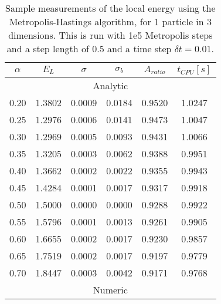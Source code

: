\documentclass[
    a4paper, aps, twocolumn, floatfix, superscriptaddress,
    nofootinbib]{revtex4-1}
\begin{document}
\begin{table}[h!]
\caption{Sample measurements of the local energy using the Metropolis-Hastings algorithm, for 1 particle in 3 dimensions. This is run with 1e5 Metropolis steps and a step length of 0.5 and a time step $\delta t = 0.01$.}
\label{tab:c_importance_sampling_1part_3dim}

\centering
\begin{ruledtabular}
\begin{tabular}{cccccc}
$\alpha$ & $E_L$  & $\sigma$ & $\sigma_b$ & $A_{ratio}$ & $t_{CPU}[\si{s}]$  \\
\hline
          \multicolumn{6}{c}{Analytic}\\
\hline


0.20     & 1.3802 & 0.0009   & 0.0184     & 0.9520      & 1.0247    \\
0.25     & 1.2976 & 0.0006   & 0.0141     & 0.9473      & 1.0047    \\
0.30     & 1.2969 & 0.0005   & 0.0093     & 0.9431      & 1.0066       \\
0.35     & 1.3205 & 0.0003   & 0.0062     & 0.9388      & 0.9951      \\
0.40     & 1.3662 & 0.0002   & 0.0022     & 0.9355      & 0.9943       \\
0.45     & 1.4284 & 0.0001   & 0.0017     & 0.9317      & 0.9918      \\
0.50     & 1.5000 & 0.0000   & 0.0000     & 0.9288      & 0.9922       \\
0.55     & 1.5796 & 0.0001   & 0.0013     & 0.9261      & 0.9905       \\
0.60     & 1.6655 & 0.0002   & 0.0017     & 0.9230      & 0.9857    \\
0.65     & 1.7519 & 0.0002   & 0.0017     & 0.9197      & 0.9779    \\
0.70     & 1.8447 & 0.0003   & 0.0042     & 0.9171      & 0.9768   \\
\hline
         \multicolumn{6}{c}{Numeric}                                                     \\
\hline


\end{tabular}
\end{ruledtabular}
\end{table}
\end{document}

